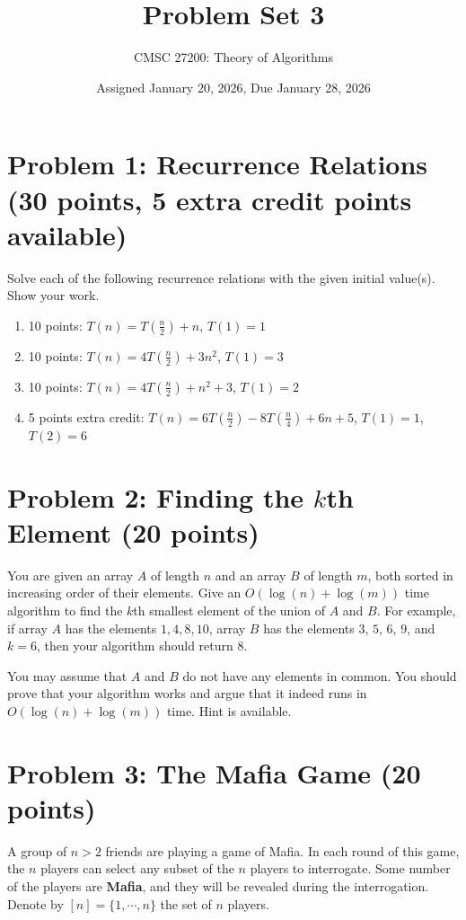 \documentclass[12pt]{article}
\title{Problem Set 3}
\author{CMSC 27200: Theory of Algorithms}
\date{Assigned January 20, 2026, Due January 28, 2026}
\begin{document}
\maketitle

\section*{Problem 1: Recurrence Relations (30 points, 5 extra credit points available)}
Solve each of the following recurrence relations with the given initial value(s). Show your work.
\begin{enumerate}
\item[(a)] 10 points: $T(n) = T(\frac{n}{2}) + n$, $T(1) = 1$
\item[(b)] 10 points: $T(n) = 4T(\frac{n}{2}) + 3n^2$, $T(1) = 3$
\item[(c)] 10 points: $T(n) = 4T(\frac{n}{2}) + n^2 + 3$, $T(1) = 2$
\item[(d)] 5 points extra credit: $T(n) = 6T(\frac{n}{2}) - 8T(\frac{n}{4}) + 6n + 5$, $T(1) = 1$, $T(2) = 6$
\end{enumerate}
\section*{Problem 2: Finding the $k$th Element (20 points)}
You are given an array $A$ of length $n$ and an array $B$ of length $m$, both sorted in increasing order of their elements. Give an $O(\log(n) + \log(m))$ time algorithm to find the $k$th smallest element of the union of $A$ and $B$. For example, if array $A$ has the elements $1,4,8,10$, array $B$ has the elements $3$, $5$, $6$, $9$, and $k = 6$, then your algorithm should return $8$.

You may assume that $A$ and $B$ do not have any elements in common. You should prove that your algorithm works and argue that it indeed runs in $O(\log(n) + \log (m))$ time. Hint is available.


\section*{Problem 3: The Mafia Game (20 points)}

A group of $n > 2$ friends are playing a game of Mafia. In each round of this game, the $n$ players can select any subset of the $n$ players to interrogate. Some number of the players are \textbf{Mafia}, and they will be revealed during the interrogation.
Denote by $[n] = \{1, \cdots, n\}$ the set of $n$ players.
 
\end{document}
